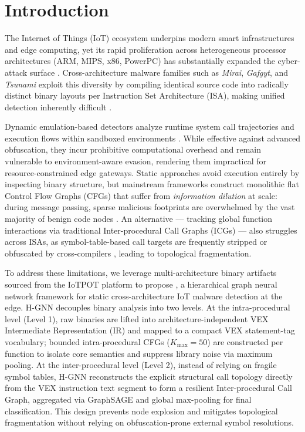\documentclass{llncs}
\begin{document}
\section{Introduction}
\label{sec:introduction}

The Internet of Things (IoT) ecosystem underpins modern smart
infrastructures and edge computing, yet its rapid proliferation
across heterogeneous processor architectures (ARM, MIPS, x86,
PowerPC) has substantially expanded the cyber-attack surface
\cite{b2}. Cross-architecture malware families such as
\textit{Mirai}, \textit{Gafgyt}, and \textit{Tsunami} exploit
this diversity by compiling identical source code into radically
distinct binary layouts per Instruction Set Architecture (ISA),
making unified detection inherently difficult \cite{b1}.

Dynamic emulation-based detectors analyze runtime system call
trajectories and execution flows within sandboxed environments
\cite{b3,b9}. While effective against advanced obfuscation,
they incur prohibitive computational overhead and remain
vulnerable to environment-aware evasion, rendering them
impractical for resource-constrained edge gateways. Static
approaches avoid execution entirely by inspecting binary
structure, but mainstream frameworks construct monolithic flat
Control Flow Graphs (CFGs) that suffer from \textit{information
dilution} at scale: during message passing, sparse malicious
footprints are overwhelmed by the vast majority of benign code
nodes \cite{b6}. 
An alternative — tracking global function interactions via traditional 
Inter-procedural Call Graphs (ICGs) — also struggles across ISAs, as symbol-table-based 
call targets are frequently stripped or obfuscated by cross-compilers \cite{b4}, 
leading to topological fragmentation.

To address these limitations, we leverage multi-architecture binary 
artifacts sourced from the IoTPOT platform \cite{b7} to propose , a
hierarchical graph neural network framework for static
cross-architecture IoT malware detection at the edge. H-GNN
decouples binary analysis into two levels. At the
intra-procedural level (Level 1), raw binaries are lifted into
architecture-independent VEX Intermediate Representation (IR)
and mapped to a compact VEX statement-tag vocabulary; bounded intra-procedural
CFGs ($K_{\max} = 50$) are constructed per function to isolate
core semantics and suppress library noise via maximum pooling. At the
inter-procedural level (Level 2), instead of relying on fragile symbol tables, 
H-GNN reconstructs the explicit structural call topology directly from 
the VEX instruction text segment to form a resilient Inter-procedural Call Graph, 
aggregated via GraphSAGE and global max-pooling for final classification. 
This design prevents node explosion and mitigates topological fragmentation without 
relying on obfuscation-prone external symbol resolutions.
\end{document}
